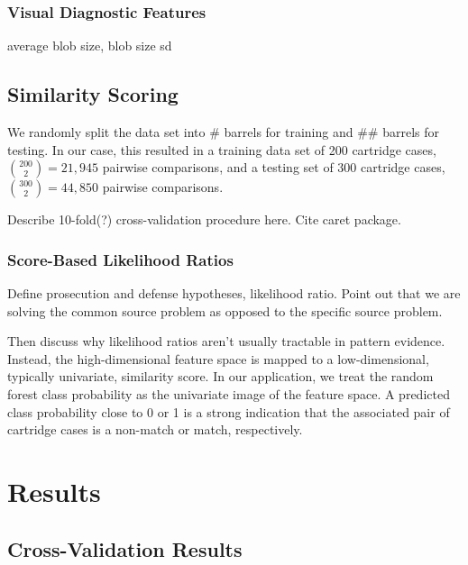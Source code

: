 \documentclass[
]{jdssv}
\begin{document}
\hypertarget{visual-diagnostic-features}{%
\subsubsection{Visual Diagnostic
Features}\label{visual-diagnostic-features}}

average blob size, blob size sd

\hypertarget{similarity-scoring}{%
\subsection{Similarity Scoring}\label{similarity-scoring}}

We randomly split the data set into \# barrels for training and \#\#
barrels for testing. In our case, this resulted in a training data set
of 200 cartridge cases, \(\binom{200}{2} = 21,945\) pairwise
comparisons, and a testing set of 300 cartridge cases,
\(\binom{300}{2} = 44,850\) pairwise comparisons.

Describe 10-fold(?) cross-validation procedure here. Cite caret package.

\hypertarget{score-based-likelihood-ratios}{%
\subsubsection{Score-Based Likelihood
Ratios}\label{score-based-likelihood-ratios}}

Define prosecution and defense hypotheses, likelihood ratio. Point out
that we are solving the common source problem as opposed to the specific
source problem.

Then discuss why likelihood ratios aren't usually tractable in pattern
evidence. Instead, the high-dimensional feature space is mapped to a
low-dimensional, typically univariate, similarity score. In our
application, we treat the random forest class probability as the
univariate image of the feature space. A predicted class probability
close to 0 or 1 is a strong indication that the associated pair of
cartridge cases is a non-match or match, respectively.

\hypertarget{results}{%
\section{Results}\label{results}}

\hypertarget{cross-validation-results}{%
\subsection{Cross-Validation Results}\label{cross-validation-results}}
\end{document}
